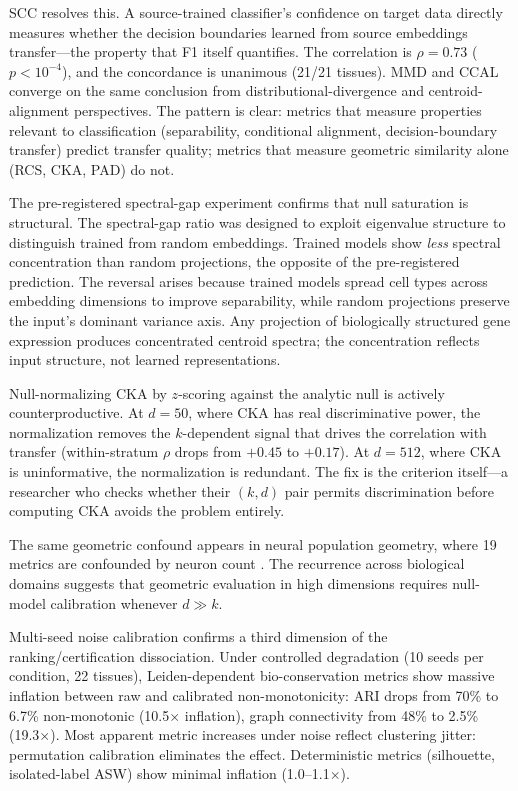 \documentclass[11pt]{article}
\begin{document}
SCC resolves this. A source-trained classifier's confidence on target
data directly measures whether the decision boundaries learned from
source embeddings transfer---the property that F1 itself
quantifies. The correlation is $\rho = 0.73$ ($p < 10^{-4}$), and the
concordance is unanimous (21/21 tissues). MMD and CCAL converge on the
same conclusion from distributional-divergence and centroid-alignment
perspectives. The pattern is clear: metrics that measure properties
relevant to classification (separability, conditional alignment,
decision-boundary transfer) predict transfer quality; metrics that
measure geometric similarity alone (RCS, CKA, PAD) do not.

The pre-registered spectral-gap experiment confirms that null saturation
is structural. The spectral-gap ratio was designed to exploit eigenvalue
structure to distinguish trained from random embeddings. Trained models
show \emph{less} spectral concentration than random projections, the
opposite of the pre-registered prediction. The reversal arises because
trained models spread cell types across embedding dimensions to improve
separability, while random projections preserve the input's dominant
variance axis. Any projection of biologically structured gene expression
produces concentrated centroid spectra; the concentration reflects input
structure, not learned representations.

Null-normalizing CKA by $z$-scoring against the analytic null is
actively counterproductive. At $d = 50$, where CKA has real
discriminative power, the normalization removes the $k$-dependent signal
that drives the correlation with transfer (within-stratum $\rho$ drops
from $+0.45$ to $+0.17$). At $d = 512$, where CKA is uninformative,
the normalization is redundant. The fix is the criterion itself---a
researcher who checks whether their $(k, d)$ pair permits discrimination
before computing CKA avoids the problem entirely.

The same geometric confound appears in neural population geometry, where
19 metrics are confounded by neuron count \citep{tower2026bracket}. The
recurrence across biological domains suggests that geometric evaluation
in high dimensions requires null-model calibration whenever $d \gg k$.

Multi-seed noise calibration confirms a third dimension of the
ranking/certification dissociation. Under controlled degradation (10
seeds per condition, 22 tissues), Leiden-dependent bio-conservation
metrics show massive inflation between raw and calibrated
non-monotonicity: ARI drops from 70\% to 6.7\% non-monotonic
(10.5$\times$ inflation), graph connectivity from 48\% to 2.5\%
(19.3$\times$). Most apparent metric increases under noise reflect
clustering jitter: permutation calibration eliminates the effect.
Deterministic metrics (silhouette, isolated-label ASW) show minimal
inflation (1.0--1.1$\times$).
\end{document}
